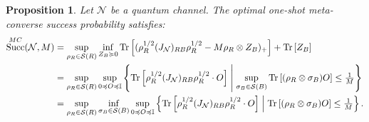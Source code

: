 \documentclass[a4paper,onecolumn,11pt,accepted=2025-10-01]{quantumarticle}
\newtheorem{prop}[theorem]{Proposition}
\DeclareMathOperator{\suc}{Succ}
\newcommand*{\dI}{\mathbb{I}}
\newcommand*{\cN}{\mathcal{N}}
\newcommand*{\cS}{\mathcal{S}}
\newcommand*{\tr}[1]{\mathrm{Tr}\left[#1\right]}
\newcommand*{\mge}{\succcurlyeq}
\newcommand*{\mle}{\preccurlyeq}
\begin{document}
\begin{prop} \label{prop-dual-MC}
Let  $\cN$ be a  quantum channel. The optimal one-shot  meta-converse  success probability satisfies: 
\begin{align}
   \suc_{}^{\rm{MC}}(\cN,M)  &= \sup_{\rho_R \in \cS(R)}\inf_{Z_B\mge 0}  \tr{(\rho_R^{1/2} ( J_{\cN})_{RB}\rho_R^{1/2} - M\rho_R\otimes Z_B)_+} + \tr{Z_B}
   \\&= \sup_{{\rho}_{R} \in \cS(R)}\sup_{0\mle O\mle \dI} \left\{\tr{\rho_R^{1/2} ( J_{\cN})_{RB}\rho_R^{1/2} \cdot O} \; \middle| \;  \sup_{\sigma_B\in \cS(B)}\tr{(\rho_R\otimes \sigma_B) O}\le \tfrac{1}{M} \right\} \label{eq:MC-dual2}
     \\&= \sup_{{\rho}_{R} \in \cS(R)} \inf_{\sigma_B\in \cS(B)}\sup_{0\mle O\mle \dI} \left\{\tr{\rho_R^{1/2} ( J_{\cN})_{RB}\rho_R^{1/2} \cdot O} \; \middle| \; \tr{(\rho_R\otimes \sigma_B) O}\le \tfrac{1}{M} \right\}. \label{eq:MC-dual3}
\end{align}
\end{prop}
\end{document}
